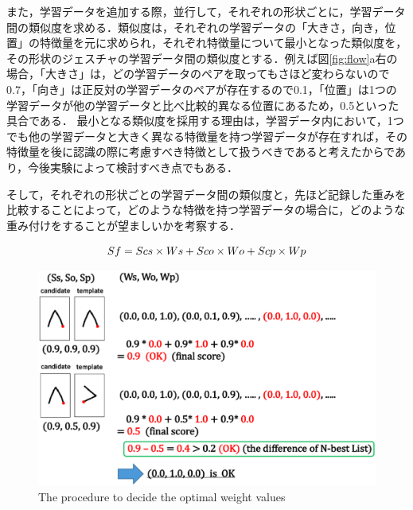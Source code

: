 また，学習データを追加する際，並行して，それぞれの形状ごとに，学習データ間の類似度を求める．類似度は，それぞれの学習データの「大きさ，向き，位置」の特徴量を元に求められ，それぞれ特徴量について最小となった類似度を，その形状のジェスチャの学習データ間の類似度とする．例えば図\ref{fig:flow}a右の場合，「大きさ」は，どの学習データのペアを取ってもさほど変わらないので0.7，「向き」は正反対の学習データのペアが存在するので0.1，「位置」は1つの学習データが他の学習データと比べ比較的異なる位置にあるため，0.5といった具合である．
最小となる類似度を採用する理由は，学習データ内において，1つでも他の学習データと大きく異なる特徴量を持つ学習データが存在すれば，その特徴量を後に認識の際に考慮すべき特徴として扱うべきであると考えたからであり，今後実験によって検討すべき点でもある．

そして，それぞれの形状ごとの学習データ間の類似度と，先ほど記録した重みを比較することによって，どのような特徴を持つ学習データの場合に，どのような重み付けをすることが望ましいかを考察する．

\begin{equation}
S{\tiny f} = S{\scriptsize cs} \times W{\scriptsize s} + S{\scriptsize co} \times W{\scriptsize o} + S{\scriptsize cp} \times W{\scriptsize p}
\end{equation}

\begin{figure} [h!]
	\begin{center}
		\includegraphics [width=0.8\hsize ]{img/weight_method1.eps}
	\end{center}
	\caption{The procedure to decide the optimal weight values }
	\label{fig:weight_method1}
\end{figure}

